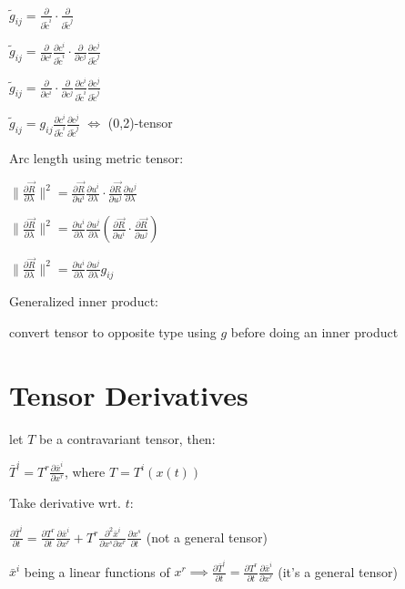 \documentclass[8pt,letter]{article}
\begin{document}
\begin{multicols*}{2}
  $\tilde{g}_{ij} = \frac{\partial}{\partial \tilde{c}^i} \cdot \frac{\partial}{\partial \tilde{c}^j}$
  
  $\tilde{g}_{ij} = \frac{\partial}{\partial c^i} \frac{\partial c^i}{\partial \tilde{c}^i} \cdot \frac{\partial}{\partial c^j} \frac{\partial c^j}{\partial \tilde{c}^j}$

  $\tilde{g}_{ij} = \frac{\partial}{\partial c^i} \cdot \frac{\partial}{\partial c^j} \frac{\partial c^i}{\partial \tilde{c}^i}\frac{\partial c^j}{\partial \tilde{c}^j}$
  
  $\tilde{g}_{ij} = g_{ij} \frac{\partial c^i}{\partial \tilde{c}^i}\frac{\partial c^j}{\partial \tilde{c}^j}$ $\iff$ (0,2)-tensor

  Arc length using metric tensor:

  $\|\frac{\partial \vec{R}}{\partial \lambda} \|^2 = \frac{\partial \vec{R}}{\partial u^i} \frac{\partial u^i}{\partial \lambda} \cdot \frac{\partial \vec{R}}{\partial u^j} \frac{\partial u^j}{\partial \lambda}$
  
  $\|\frac{\partial \vec{R}}{\partial \lambda} \|^2 = \frac{\partial u^i}{\partial \lambda} \frac{\partial u^j}{\partial \lambda} (\frac{\partial \vec{R}}{\partial u^i} \cdot \frac{\partial \vec{R}}{\partial u^j})$

  $\|\frac{\partial \vec{R}}{\partial \lambda} \|^2 = \frac{\partial u^i}{\partial \lambda} \frac{\partial u^j}{\partial \lambda} g_{ij}$

  Generalized inner product:

  convert tensor to opposite type using $g$ before doing an inner product
  
  \vfill\null
  \pagebreak
    
  \section{Tensor Derivatives}
  
  let $T$ be a contravariant tensor, then:

  $\bar{T}^i = T^r \frac{\partial \bar{x}^i}{\partial x^r}$, where $T=T^i(x(t))$

  Take derivative wrt. $t$:

  $\frac{\partial \bar{T}^i}{\partial t} = \frac{\partial T^r}{\partial t} \frac{\partial \bar{x}^i}{\partial x^r} + T^r \frac{\partial^2 \bar{x}^i}{\partial x^s \partial x^r} \frac{\partial x^s}{\partial t}$ (not a general tensor)

  $\bar{x}^i$ being a linear functions of $x^r \implies \frac{\partial \bar{T}^i}{\partial t} = \frac{\partial T^r}{\partial t} \frac{\partial \bar{x}^i}{\partial x^r}$ (it's a general tensor)
  

\end{multicols*}
\end{document}
